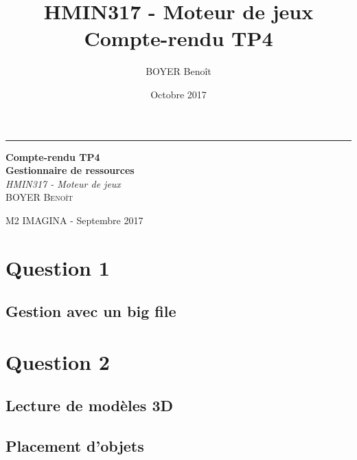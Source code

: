 \documentclass[a4paper,11pt]{report}
\title{HMIN317 - Moteur de jeux \\ Compte-rendu TP4}
\author{BOYER Benoît}
\date{Octobre 2017}
\begin{document}
  	  \begin{titlepage} %
	
	  \raggedleft %
	
	  \rule{1pt}{\textheight} %
	  \hspace{0.05\textwidth} %
	  \parbox[b]{0.75\textwidth}{ %
		
		  {\Huge\bfseries Compte-rendu TP4 \\[0.5\baselineskip] Gestionnaire de ressources}\\[2\baselineskip] %
		  {\large\textit{HMIN317 - Moteur de jeux}}\\[4\baselineskip] %
		  {\Large\textsc{BOYER Benoît}} %
		
		  \vspace{0.5\textheight} %
		
		  {\noindent M2 IMAGINA - Septembre 2017}\\[\baselineskip] %
	  }

  \end{titlepage}
  
    \tableofcontents
	\pagebreak


    \section{Question 1}
    \subsection{Gestion avec un big file}


	\pagebreak
	\section{Question 2}
	\subsection{Lecture de modèles 3D}
	
	\subsection{Placement d'objets}
	
\end{document}
